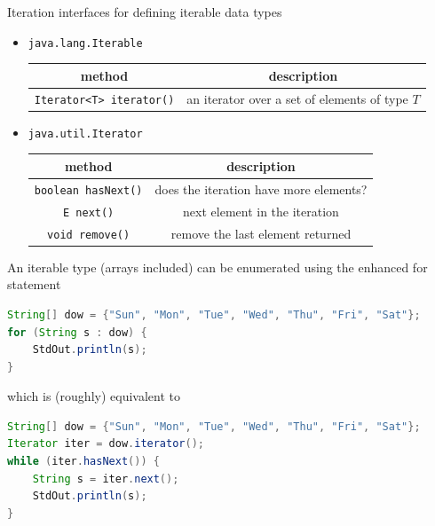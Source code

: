 \documentclass[8pt,a4paper,compress]{beamer}
\begin{document}
\begin{frame}[fragile]
\pause

Iteration interfaces for defining iterable data types
\begin{itemize}
\pause
\item \lstinline{java.lang.Iterable}
\begin{center}
\begin{tabular}{cc}
method & description \\ \hline
\lstinline$Iterator<T> iterator()$ & an iterator over a set of elements of type $T$
\end{tabular} 
\end{center}

\pause
\item \lstinline{java.util.Iterator}
\begin{center}
\begin{tabular}{cc}
method & description \\ \hline
\lstinline$boolean hasNext()$ & does the iteration have more elements? \\
\lstinline$E next()$ & next element in the iteration \\
\lstinline$void remove()$ & remove the last element returned
\end{tabular} 
\end{center}
\end{itemize}

\pause\bigskip

An iterable type (arrays included) can be enumerated using the enhanced for statement

\smallskip

\begin{lstlisting}[language=Java,style=focusin]
String[] dow = {"Sun", "Mon", "Tue", "Wed", "Thu", "Fri", "Sat"};
for (String s : dow) {
    StdOut.println(s);
}
\end{lstlisting}

\pause\smallskip

which is (roughly) equivalent to

\smallskip

\begin{lstlisting}[language=Java,style=focusin]
String[] dow = {"Sun", "Mon", "Tue", "Wed", "Thu", "Fri", "Sat"};
Iterator iter = dow.iterator();
while (iter.hasNext()) {
    String s = iter.next();
    StdOut.println(s);
}
\end{lstlisting}
\end{frame}
\end{document}
